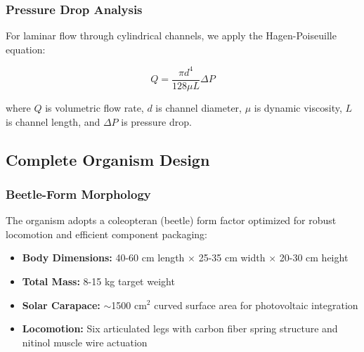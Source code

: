 \subsubsection{Pressure Drop Analysis}

For laminar flow through cylindrical channels, we apply the Hagen-Poiseuille equation:

\begin{equation}
    Q = \frac{\pi d^4}{128 \mu L}\Delta P
\end{equation}

where $Q$ is volumetric flow rate, $d$ is channel diameter, $\mu$ is dynamic viscosity, $L$ is channel length, and $\Delta P$ is pressure drop.

\subsection{Complete Organism Design}

\subsubsection{Beetle-Form Morphology}
The organism adopts a coleopteran (beetle) form factor optimized for robust locomotion and efficient component packaging:

\begin{itemize}
    \item \textbf{Body Dimensions:} 40-60 cm length $\times$ 25-35 cm width $\times$ 20-30 cm height
    \item \textbf{Total Mass:} 8-15 kg target weight
    \item \textbf{Solar Carapace:} $\sim$1500 cm$^2$ curved surface area for photovoltaic integration
    \item \textbf{Locomotion:} Six articulated legs with carbon fiber spring structure and nitinol muscle wire actuation
\end{itemize}

